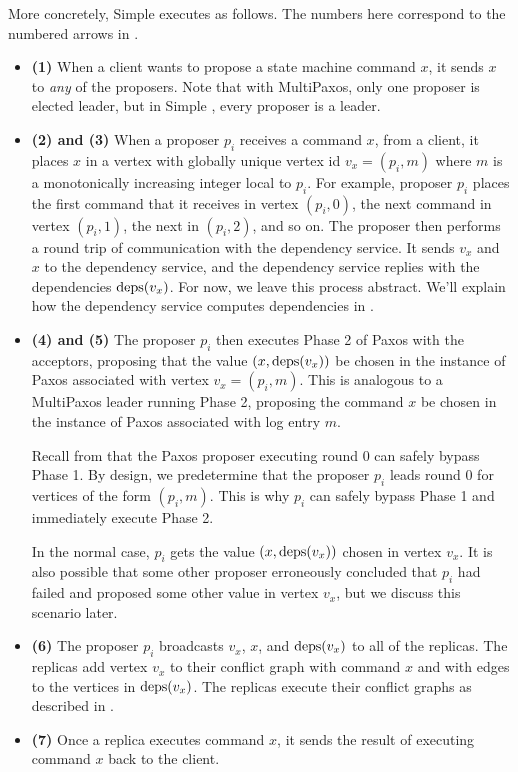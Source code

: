 More concretely, Simple \BPaxos{} executes as follows. The numbers here
correspond to the numbered arrows in .
\begin{itemize}
  \item \textbf{(1)}
    When a client wants to propose a state machine command $x$, it sends $x$ to
    \emph{any} of the proposers. Note that with MultiPaxos, only one proposer
    is elected leader, but in Simple \BPaxos{}, every proposer is a leader.

  \item \textbf{(2) and (3)}
    When a proposer $p_i$ receives a command $x$, from a client, it places $x$
    in a vertex with globally unique vertex id $v_x = (p_i, m)$ where $m$ is a
    monotonically increasing integer local to $p_i$. For example, proposer
    $p_i$ places the first command that it receives in vertex $(p_i, 0)$, the
    next command in vertex $(p_i, 1)$, the next in $(p_i, 2)$, and so on. The
    proposer then performs a round trip of communication with the dependency
    service. It sends $v_x$ and $x$ to the dependency service, and the
    dependency service replies with the dependencies $\text{deps}(v_x)$. For now, we
    leave this process abstract. We'll explain how the dependency service
    computes dependencies in .

  \item \textbf{(4) and (5)}
    The proposer $p_i$ then executes Phase 2 of Paxos with the acceptors,
    proposing that the value $(x, \text{deps}(v_x))$ be chosen in the instance of
    Paxos associated with vertex $v_x = (p_i, m)$. This is analogous to a
    MultiPaxos leader running Phase 2, proposing the command $x$ be chosen in
    the instance of Paxos associated with log entry $m$.

    Recall from  that the Paxos proposer executing round 0
    can safely bypass Phase 1. By design, we predetermine that the proposer
    $p_i$ leads round $0$ for vertices of the form $(p_i, m)$. This is why
    $p_i$ can safely bypass Phase 1 and immediately execute Phase 2.

    In the normal case, $p_i$ gets the value $(x, \text{deps}(v_x))$ chosen in vertex
    $v_x$. It is also possible that some other proposer erroneously concluded
    that $p_i$ had failed and proposed some other value in vertex $v_x$, but we
    discuss this scenario later.

  \item \textbf{(6)}
    The proposer $p_i$ broadcasts $v_x$, $x$, and $\text{deps}(v_x)$ to all of the
    replicas. The replicas add vertex $v_x$ to their conflict graph with
    command $x$ and with edges to the vertices in $\text{deps}(v_x)$. The replicas
    execute their conflict graphs as described in .

  \item \textbf{(7)}
    Once a replica executes command $x$, it sends the result of executing
    command $x$ back to the client.
\end{itemize}

